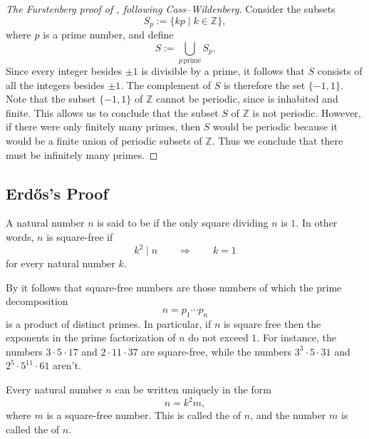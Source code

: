 \begin{proof}[The Furstenberg proof of , following Cass--Wildenberg]
  Consider the subsets
  \begin{equation*}
    S_p:=\{kp\mid k\in\mathbb{Z}\},
  \end{equation*}
  where $p$ is a prime number, and define
  \begin{equation*}
    S:=\bigcup_{p\,\mathrm{prime}}S_p.
  \end{equation*}
  Since every integer besides $\pm 1$ is divisible by a prime, it follows that $S$ consists of all the integers besides $\pm 1$. The complement of $S$ is therefore the set $\{-1,1\}$. Note that the subset $\{-1,1\}$ of $\mathbb{Z}$ cannot be periodic, since is inhabited and finite. This allows us to conclude that the subset $S$ of $\mathbb{Z}$ is not periodic. However, if there were only finitely many primes, then $S$ would be periodic because it would be a finite union of periodic subsets of $\mathbb{Z}$. Thus we conclude that there must be infinitely many primes.
\end{proof}

\subsection{Erd\H{o}s's Proof}

\begin{definition}
  A natural number $n$ is said to be  if the only square dividing $n$ is $1$. In other words, $n$ is square-free if
  \begin{equation*}
    k^2\mid n\qquad\Rightarrow\qquad k=1
  \end{equation*}
  for every natural number $k$.
\end{definition}

By  it follows that square-free numbers are those numbers of which the prime decomposition
\begin{equation*}
  n=p_1\cdots p_n
\end{equation*}
is a product of distinct primes. In particular, if $n$ is square free then the exponents in the prime factorization of $n$ do not exceed $1$. For instance, the numbers $3\cdot 5\cdot 17$ and $2\cdot 11\cdot 37$ are square-free, while the numbers $3^3\cdot 5\cdot 31$ and $2^5\cdot 5^{11}\cdot 61$ aren't.

\begin{theorem}\label{theorem:square-free-decomposition}
  Every natural number $n$ can be written uniquely in the form
  \begin{equation*}
    n=k^2m,
  \end{equation*}
  where $m$ is a square-free number. This is called the  of $n$, and the number $m$ is called the  of $n$.
\end{theorem}

